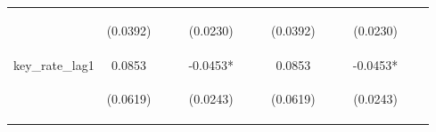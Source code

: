 \documentclass[]{article}
\begin{document}
\begin{center}
\begin{tabular}{lcccccccccccc}
\vspace{4pt} & \begin{footnotesize}(0.0392)\end{footnotesize} & \begin{footnotesize}\end{footnotesize} & \begin{footnotesize}\end{footnotesize} & \begin{footnotesize}(0.0230)\end{footnotesize} & \begin{footnotesize}\end{footnotesize} & \begin{footnotesize}\end{footnotesize} & \begin{footnotesize}(0.0392)\end{footnotesize} & \begin{footnotesize}\end{footnotesize} & \begin{footnotesize}\end{footnotesize} & \begin{footnotesize}(0.0230)\end{footnotesize} & \begin{footnotesize}\end{footnotesize} & \begin{footnotesize}\end{footnotesize} \\
key\_rate\_lag1 & 0.0853 &  &  & -0.0453* &  &  & 0.0853 &  &  & -0.0453* &  &  \\
\vspace{4pt} & \begin{footnotesize}(0.0619)\end{footnotesize} & \begin{footnotesize}\end{footnotesize} & \begin{footnotesize}\end{footnotesize} & \begin{footnotesize}(0.0243)\end{footnotesize} & \begin{footnotesize}\end{footnotesize} & \begin{footnotesize}\end{footnotesize} & \begin{footnotesize}(0.0619)\end{footnotesize} & \begin{footnotesize}\end{footnotesize} & \begin{footnotesize}\end{footnotesize} & \begin{footnotesize}(0.0243)\end{footnotesize} & \begin{footnotesize}\end{footnotesize} & \begin{footnotesize}\end{footnotesize} \\

\end{tabular}
\end{center}
\end{document}
